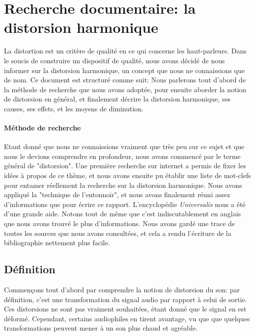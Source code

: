 \documentclass{article}
\begin{document}
\section{Recherche documentaire: la distorsion harmonique}

La distortion est un critère de qualité en ce qui concerne les haut-parleurs.
Dans le soucis de construire un dispositif de qualité, nous avons décidé de 
nous informer sur la distorsion harmonique, un concept que nous ne connaissions
que de nom.
Ce document est structuré comme suit: Nous parlerons tout d'abord de la méthode 
de recherche que nous avons adoptée, pour ensuite aborder la notion  de distorsion 
en général, et finalement décrire la distorsion harmonique, ses causes, ses effets,
et les moyens de diminution.

\paragraph{Méthode de recherche}
Etant donné que nous ne connaissions vraiment que très peu sur ce sujet et que nous 
le devions comprendre en profondeur, nous avons commencé par le terme général de "distorsion". 
Une première recherche sur internet a permis de fixer les idées à propos de ce thème, et nous 
avons ensuite pu établir une liste de mot-clefs pour entamer réellement la recherche sur la 
distorsion harmonique. Nous avons appliqué la "technique de l'entonnoir", et nous avons finalement 
réuni assez d'informations que pour écrire ce rapport. L'encyclopédie \textit{Universalis} nous a 
été d'une grande aide. Notons tout de même que c'est indiscutablement en anglais que nous avons 
trouvé le plus d'informations. Nous avons gardé une trace de toutes les sources que nous avons 
consultées, et cela a rendu l'écriture de la bibliographie nettement plus facile.

\subsection{Définition}
Commençons tout d'abord par comprendre la notion de distorsion du son: par définition, c'est
une transformation du signal audio par rapport à celui de sortie. Ces distorsions ne sont pas vraiment souhaitées, étant donné
que le signal en est déformé. Cependant, certains audiophiles en tirent avantage, vu que que quelques
transformations peuvent mener à un son plus chaud et agréable.
\end{document}
